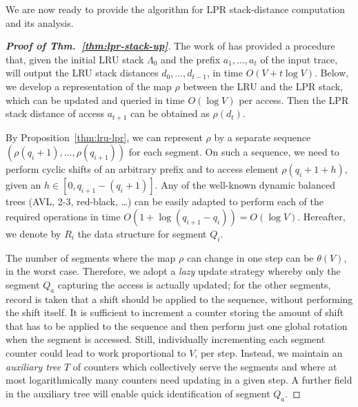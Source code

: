 \documentclass[11pt,a4paper]{article}
\newcommand{\comment}[1]{}
\theoremstyle{definition}
\theoremstyle{remark}
\begin{document}
\comment{**************************************************************
\begin{figure}
  \centering
  \texttt{[image: images/stack-update]}
  \caption{LPR stack update (steady state). $b_t$ is the LPR stack depth
   of the access $a_t$ and $y_t(C)$ the eviction made by the buffer of
   capacity $C$.}
  \label{fig:stack-up}
\end{figure}
end-of-comment*********************************************************}

We are now ready to provide the algorithm for LPR stack-distance
computation and its analysis.

\begin{proof}[{\bf Proof of Thm.~\ref{thm:lpr-stack-up}}] The work of
\cite{BennettK75,AlmasiCP02} has provided a procedure that, given the 
initial LRU stack $\Lambda_0$ and the prefix $a_1, \dots, a_t$ of the
input trace, will output the LRU stack distances $d_0,\ldots,d_{t-1}$, in
time $O(V+ t \log V)$. Below, we develop a representation of the map
$\rho$ between the LRU and the LPR stack, which can be updated and
queried in time $O(\log V)$ per access. Then the LPR stack distance of
access $a_{t+1}$ can be obtained as $\rho(d_t)$.

By Proposition~\ref{thm:lru-lpr}, we can represent $\rho$ by a
separate sequence $(\rho(q_i+1), \ldots, \rho(q_{i+1}))$ for each
segment. On such a sequence, we need to perform cyclic shifts of an
arbitrary prefix and to access element $\rho(q_i+1+h)$, given an $h
\in [0,q_{i+1}-(q_i+1)]$. Any of the well-known dynamic balanced trees
(AVL, 2-3, red-black, \dots) \cite{CormenLRS04} can be easily adapted to
perform each of the required operations in time
$O(1+\log(q_{i+1}-q_i)) = O(\log V)$. Hereafter, we denote by $R_i$
the data structure for segment $Q_i$.

The number of segments where the map $\rho$ can change in one step can
be $\theta(V)$, in the worst case. Therefore, we adopt a \emph{lazy}
update strategy whereby only the segment $Q_a$ capturing the access is
actually updated; for the other segments, record is taken that a shift
should be applied to the sequence, without performing the shift
itself. It is sufficient to increment a counter storing the amount of
shift that has to be applied to the sequence and then perform just one
global rotation when the segment is accessed. Still, individually
incrementing each segment counter could lead to work proportional to
$V$, per step. Instead, we maintain an
\emph{auxiliary tree} $T$ of counters which collectively serve the 
segments and where at most logarithmically many counters need updating
in a given step. A further field in the auxiliary tree will enable
quick identification of segment $Q_a$.


\end{proof}
\end{document}
